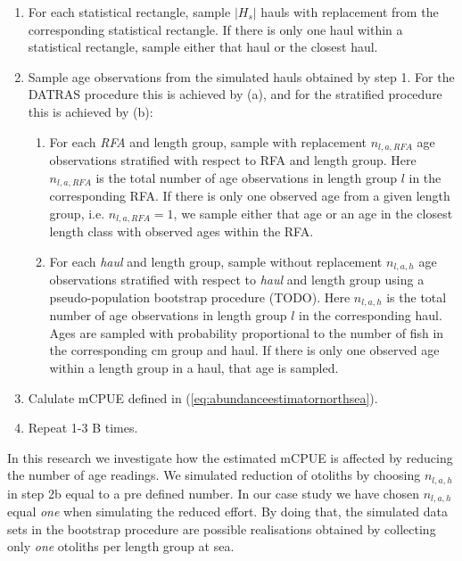 \documentclass[a4paper 12pt]{article}
\numberwithin{equation}{section}
\begin{document}
\begin{enumerate}
\item For each statistical rectangle, sample $|H_s|$ hauls with replacement from the corresponding statistical rectangle. If there is only one haul within a statistical rectangle, sample either that haul or the closest haul.
\item Sample age observations from the simulated hauls obtained by step 1. For the DATRAS procedure this is achieved by (a), and for the stratified procedure this is achieved by (b):
\begin{enumerate}
\item For each \textit{RFA} and length group, sample with replacement $n_{l,a,RFA}$ age observations stratified with respect to RFA and length group. Here $n_{l,a,RFA}$ is the total number of age observations in length group $l$ in the corresponding RFA. If there is only one observed age from a given length group, i.e. $n_{l,a,RFA} = 1$, we sample either that age or an age in the closest length class with observed ages within the RFA.
\item For each \textit{haul} and length group, sample without replacement  $n_{l,a,h}$ age observations stratified with respect to \textit{haul} and length group using a pseudo-population bootstrap procedure \citep{mashreghi2016survey} (TODO). Here $n_{l,a,h}$ is the total number of age observations in length group $l$ in the corresponding haul. Ages are sampled with probability  proportional to the number of fish in the corresponding cm group and haul. If there is only one observed age within a length group in a haul, that age is sampled.
\end{enumerate}
\item Calulate mCPUE defined in (\ref{eq:abundanceestimatornorthsea}).
\item Repeat 1-3 B times.
\end{enumerate}

In this research we investigate how the estimated mCPUE is affected by reducing the number of age readings. We simulated reduction of otoliths by choosing $n_{l,a,h}$ in step 2b equal to a pre defined number. In our case study we have chosen $n_{l,a,h}$ equal \textit{one} when simulating the reduced effort. By doing that, the simulated data sets in the bootstrap procedure are possible realisations obtained by collecting only \textit{one} otoliths per length group at sea.
\end{document}
